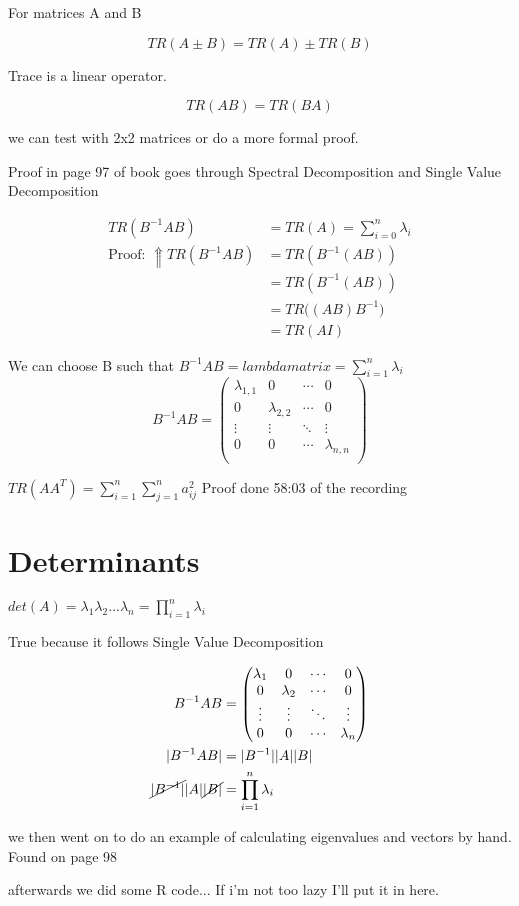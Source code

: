 For matrices A and B

\[TR(A \pm B)= TR(A) \pm TR(B)\]

Trace is a linear operator.
 
\[TR(AB) = TR(BA)\]

we can test with 2x2 matrices or do a more formal proof.

Proof in page 97 of book goes through Spectral Decomposition and Single Value Decomposition

\begin{align*}
TR(B^{-1}AB) &= TR(A) = \displaystyle\sum_{i=0}^{n} \lambda_i \\ \text{Proof: } \Uparrow
TR(B^{-1}AB) &=TR(B^{-1}(AB)) \\ &=TR(B^{-1}(AB))\\ &=TR\big((AB)B^{-1}\big) \\&=TR(AI)
\end{align*}

We can choose B such that 
$B^{-1}AB = lambda matrix = \sum_{i=1}^{n} \lambda_i$
\begin{equation*}
B^{-1}AB =
    \begin{pmatrix}
    \lambda_{1,1} & 0 & \cdots & 0 \\
    0 & \lambda_{2,2} & \cdots & 0 \\
    \vdots & \vdots & \ddots & \vdots \\
    0 & 0 & \cdots & \lambda_{n,n} \\
    \end{pmatrix}
\end{equation*}


$TR(AA^T) = \displaystyle\sum_{i=1}^{n} \displaystyle\sum_{j=1}^{n}a_{ij}^2$
Proof done 58:03 of the recording

\section{Determinants}
$det(A) = \lambda_1 \lambda_2...\lambda_n = \prod^n_{i=1}\lambda_i$

True because it follows Single Value Decomposition

\begin{align*}
B^{-1}AB &= \begin{pmatrix}
\lambda_1 & 0 &\cdots &0\\
0 & \lambda_2 &\cdots &0\\
\vdots & \vdots &\ddots & \vdots\\
0 & 0 &\cdots & \lambda_n\\
\end{pmatrix} \\
|B^{-1}AB| &= |B^{-1}||A||B|\\
\cancel{|B^{-1}|}|A|\cancel{|B|}&=\prod_{i=1}^{n}\lambda_i
\end{align*}


we then went on to do an example of calculating eigenvalues and vectors by hand. Found on page 98

afterwards we did some R code... If i'm not too lazy I'll put it in here.

